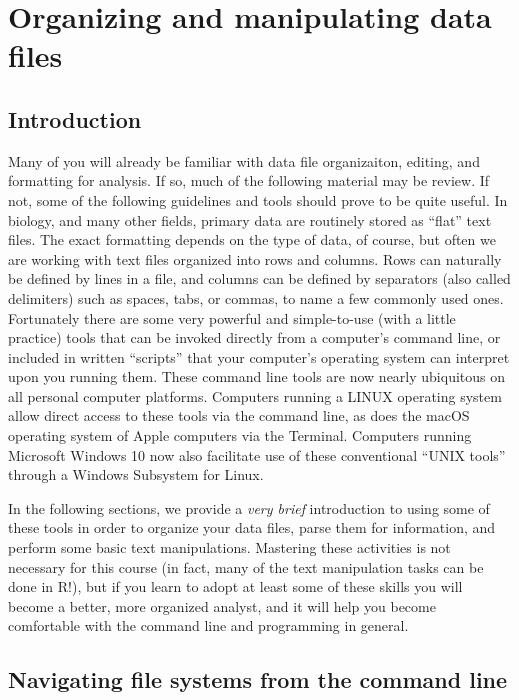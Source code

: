 \documentclass[
]{book}
\begin{document}
\hypertarget{organizing-and-manipulating-data-files}{%
\chapter{Organizing and manipulating data files}\label{organizing-and-manipulating-data-files}}

\hypertarget{introduction}{%
\section{Introduction}\label{introduction}}

Many of you will already be familiar with data file organizaiton, editing, and formatting for analysis. If so, much of the following material may be review. If not, some of the following guidelines and tools should prove to be quite useful. In biology, and many other fields, primary data are routinely stored as ``flat'' text files. The exact formatting depends on the type of data, of course, but often we are working with text files organized into rows and columns. Rows can naturally be defined by lines in a file, and columns can be defined by separators (also called delimiters) such as spaces, tabs, or commas, to name a few commonly used ones. Fortunately there are some very powerful and simple-to-use (with a little practice) tools that can be invoked directly from a computer's command line, or included in written ``scripts'' that your computer's operating system can interpret upon you running them. These command line tools are now nearly ubiquitous on all personal computer platforms. Computers running a LINUX operating system allow direct access to these tools via the command line, as does the macOS operating system of Apple computers via the Terminal. Computers running Microsoft Windows 10 now also facilitate use of these conventional ``UNIX tools'' through a Windows Subsystem for Linux.

In the following sections, we provide a \emph{very brief} introduction to using some of these tools in order to organize your data files, parse them for information, and perform some basic text manipulations. Mastering these activities is not necessary for this course (in fact, many of the text manipulation tasks can be done in R!), but if you learn to adopt at least some of these skills you will become a better, more organized analyst, and it will help you become comfortable with the command line and programming in general.

\hypertarget{navigating-file-systems-from-the-command-line}{%
\section{Navigating file systems from the command line}\label{navigating-file-systems-from-the-command-line}}
\end{document}
